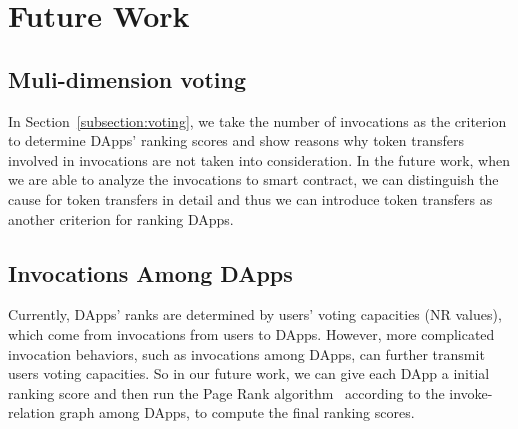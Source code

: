 \section{Future Work}

\subsection{Muli-dimension voting}
\noindent
In Section~\ref{subsection:voting}, we take the number of invocations as the criterion to determine DApps' ranking scores and show reasons why token transfers involved in invocations are not taken into consideration. In the future work, when we are able to analyze the invocations to smart contract, we can  distinguish the cause for token transfers in detail and thus we can introduce token transfers as another criterion for ranking DApps.

\subsection{Invocations Among DApps}
\noindent
Currently, DApps' ranks are determined by users' voting capacities (NR values), which come from invocations from users to DApps. However, more complicated invocation behaviors, such as invocations among DApps, can further transmit users voting capacities. So in our future work, we can give each DApp a initial ranking score and then run the Page Rank algorithm~\cite{page1999pagerank} according to the invoke-relation graph among DApps, to compute the final ranking scores.
